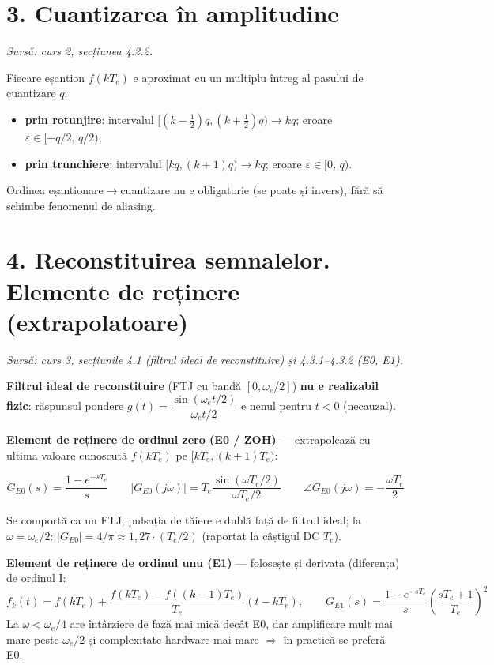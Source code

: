 \documentclass[10pt,a4paper]{article}
\newcommand{\srcnote}[1]{{\footnotesize\color{gray!55!black}\textit{Sursă: #1}}\par}
\begin{document}
\section*{3. Cuantizarea în amplitudine}\label{sec:3}
\srcnote{curs 2, secțiunea 4.2.2.}
Fiecare eșantion $f(kT_e)$ e aproximat cu un multiplu întreg al pasului de cuantizare $q$:
\begin{itemize}
\item \textbf{prin rotunjire}: intervalul $[(k-\tfrac12)q,(k+\tfrac12)q)\to kq$; eroare $\varepsilon\in[-q/2,\,q/2)$;
\item \textbf{prin trunchiere}: intervalul $[kq,(k+1)q)\to kq$; eroare $\varepsilon\in[0,\,q)$.
\end{itemize}
Ordinea eșantionare$\to$cuantizare nu e obligatorie (se poate și invers), fără să schimbe fenomenul de aliasing.

\section*{4. Reconstituirea semnalelor. Elemente de reținere (extrapolatoare)}\label{sec:4}
\srcnote{curs 3, secțiunile 4.1 (filtrul ideal de reconstituire) și 4.3.1–4.3.2 (E0, E1).}
\textbf{Filtrul ideal de reconstituire} (FTJ cu bandă $[0,\omega_e/2]$) \textbf{nu e realizabil fizic}: răspunsul pondere $g(t)=\dfrac{\sin(\omega_e t/2)}{\omega_e t/2}$ e nenul pentru $t<0$ (necauzal).

\textbf{Element de reținere de ordinul zero (E0 / ZOH)} — extrapolează cu ultima valoare cunoscută $f(kT_e)$ pe $[kT_e,(k{+}1)T_e)$:
\begin{keyeq}\color{red!65!black}
$$G_{E0}(s)=\dfrac{1-e^{-sT_e}}{s}\qquad |G_{E0}(j\omega)|=T_e\dfrac{\sin(\omega T_e/2)}{\omega T_e/2}\qquad \angle G_{E0}(j\omega)=-\dfrac{\omega T_e}{2}$$
\end{keyeq}
Se comportă ca un FTJ; pulsația de tăiere e dublă față de filtrul ideal; la $\omega=\omega_e/2$: $|G_{E0}|=4/\pi\approx1{,}27\cdot(T_e/2)$ (raportat la câștigul DC $T_e$).

\textbf{Element de reținere de ordinul unu (E1)} — folosește și derivata (diferența) de ordinul I:
$$f_k(t)=f(kT_e)+\dfrac{f(kT_e)-f((k-1)T_e)}{T_e}(t-kT_e),\qquad G_{E1}(s)=\dfrac{1-e^{-sT_e}}{s}\left(\dfrac{sT_e+1}{T_e}\right)^2$$
La $\omega<\omega_e/4$ are întârziere de fază mai mică decât E0, dar amplificare mult mai mare peste $\omega_e/2$ și complexitate hardware mai mare $\Rightarrow$ în practică se preferă E0.
\end{document}
